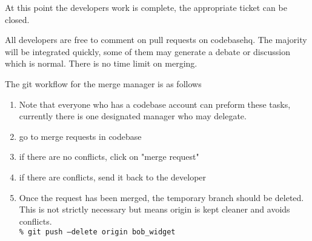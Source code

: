 \documentclass[12pt, a4paper]{article}
\begin{document}
At this point the developers work is complete, the appropriate ticket can be closed.

All developers are free to comment on pull requests on codebasehq. The majority will be integrated quickly, some of them may generate a debate or discussion which is normal. There is no time limit on merging.


The git workflow for the merge manager is as follows
\begin{enumerate}
\item Note that everyone who has a codebase account can preform these tasks, currently there is one designated manager who may delegate.
\item go to merge requests in codebase
\item if there are no conflicts, click on "merge request"
\item if there are conflicts, send it back to the developer
\item Once the request has been merged, the temporary branch should be deleted. This is not strictly necessary but means origin is kept cleaner and avoids conflicts.\\
 \texttt{\% git push --delete origin bob\_widget}
\end{enumerate}
\end{document}
